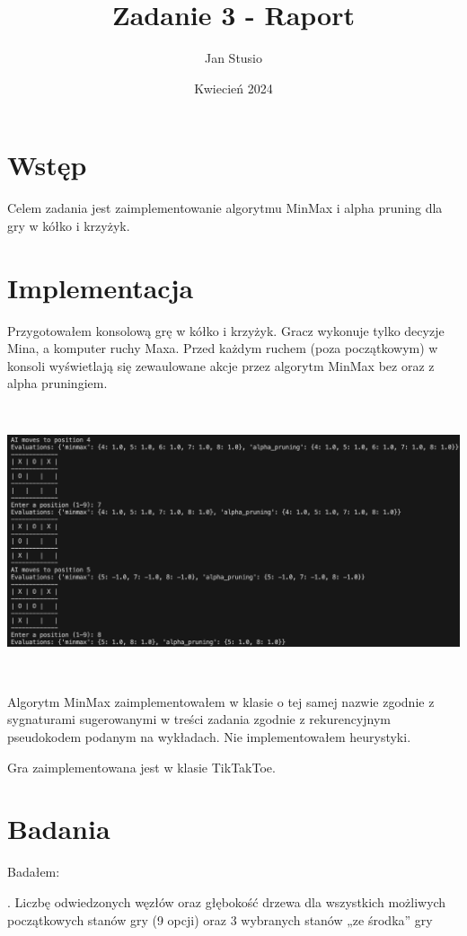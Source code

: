 \documentclass{article}
\title{Zadanie 3 - Raport}
\author{Jan Stusio}
\date{Kwiecień 2024}
\begin{document}
\maketitle

\section{Wstęp}

Celem zadania jest zaimplementowanie algorytmu MinMax i alpha pruning dla gry w kółko i krzyżyk.


\section{Implementacja}

Przygotowałem konsolową grę w kółko i krzyżyk. Gracz wykonuje tylko decyzje Mina, a komputer ruchy Maxa. Przed każdym ruchem (poza początkowym) w konsoli wyświetlają się zewaulowane akcje przez algorytm MinMax bez oraz z alpha pruningiem.

\includegraphics[width=18cm, height=8cm]{Screenshot 2024-04-07 at 22.18.07.png}

Algorytm MinMax zaimplementowałem w klasie o tej samej nazwie zgodnie z sygnaturami sugerowanymi w treści zadania zgodnie z rekurencyjnym pseudokodem podanym na wykładach. Nie implementowałem heurystyki.


Gra zaimplementowana jest w klasie TikTakToe.

\section{Badania}

Badałem:

. Liczbę odwiedzonych węzłów oraz głębokość drzewa dla wszystkich możliwych początkowych stanów gry (9 opcji) oraz 3 wybranych stanów „ze środka” gry
\end{document}

